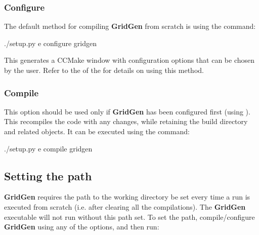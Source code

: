 \documentclass[letterpaper,10pt,english]{sphinxmanual}
\begin{document}
\subsubsection{Configure}
\label{\detokenize{gridpyfiles/compile:configure}}
The default method for compiling {\color{red}\bfseries{}\textbar{}GridGen\textbar{}} from scratch is using the command:

\begin{sphinxVerbatim}[commandchars=\\\{\}]
\PYGZdl{} ./setup.py \PYGZhy{}e configure gridgen
\end{sphinxVerbatim}

This generates a CCMake window with configuration options that can be chosen by the user. Refer to the {\hyperref[\detokenize{setup:compilation}]{}} of the {\hyperref[\detokenize{setup:setup-gridgen}]{}} for details on using this method.


\subsubsection{Compile}
\label{\detokenize{gridpyfiles/compile:compile}}
This option should be used only if {\color{red}\bfseries{}\textbar{}GridGen\textbar{}} has been configured first (using ). This recompiles the code with any changes, while retaining the build directory and related objects. It can be executed using the command:

\begin{sphinxVerbatim}[commandchars=\\\{\}]
\PYGZdl{} ./setup.py \PYGZhy{}e compile gridgen
\end{sphinxVerbatim}


\subsection{Setting the path}
\label{\detokenize{gridpyfiles/compile:setting-the-path}}
{\color{red}\bfseries{}\textbar{}GridGen\textbar{}} requires the path to the working directory be set every time a run is executed from scratch (i.e. after clearing all the compilations). The {\color{red}\bfseries{}\textbar{}GridGen\textbar{}} executable  will not run without this path set. To set the path, compile/configure {\color{red}\bfseries{}\textbar{}GridGen\textbar{}} using any of the options, and then run:
\end{document}
